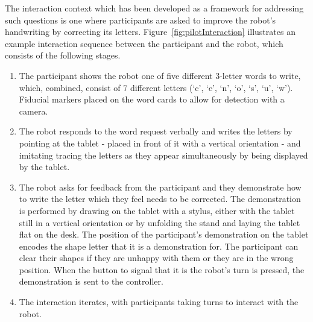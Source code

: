 \documentclass{sig-alternate}
\begin{document}
The interaction context which has been developed as a framework for addressing
such questions is one where participants are asked to improve the robot's
handwriting by correcting its letters. Figure~\ref{fig:pilotInteraction}
illustrates an example interaction sequence between the participant and the
robot, which consists of the following stages.

\begin{enumerate}

    \item The participant shows the robot one of five different 3-letter words
        to write, which, combined, consist of 7 different letters (`c', `e',
        `n', `o', `s', `u', `w'). Fiducial markers placed on the word cards to
        allow for detection with a camera. 

    \item The robot responds to the word request verbally and writes the letters
        by pointing at the tablet - placed in front of it with a vertical
        orientation - and imitating tracing the letters as they appear
        simultaneously by being displayed by the tablet. 

    \item The robot asks for feedback from the participant and they demonstrate
        how to write the letter which they feel needs to be corrected. The
        demonstration is performed by drawing on the tablet with a stylus,
        either with the tablet still in a vertical orientation or by unfolding
        the stand and laying the tablet flat on the desk. The position of the
        participant's demonstration on the tablet encodes the shape letter that
        it is a demonstration for. The participant can clear their shapes if
        they are unhappy with them or they are in the wrong position. When the
        button to signal that it is the robot's turn is pressed, the
        demonstration is sent to the controller.

    \item The interaction iterates, with participants taking turns to interact
        with the robot.

\end{enumerate}

	
\end{document}
